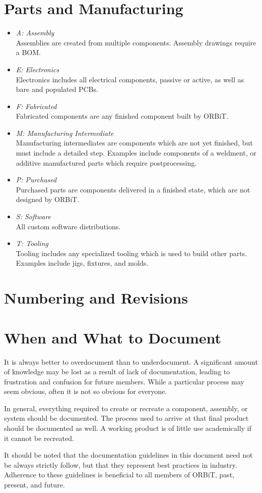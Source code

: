 \documentclass[12pt,article]{memoir}
\begin{document}
\newpage

\chapter{Parts and Manufacturing}
\begin{itemize}
\item \textit{A: Assembly}\\
Assemblies are created from multiple components. Assembly drawings require a BOM.
\item \textit{E: Electronics}\\
Electronics includes all electrical components, passive or active, as well as bare and populated PCBs.
\item \textit{F: Fabricated}\\
Fabricated components are any finished component built by ORBiT.
\item \textit{M: Manufacturing Intermediate}\\
Manufacturing intermediates are components which are not yet finished, but must include a detailed step. Examples include components of a weldment, or additive manufactured parts which require postprocessing.
\item \textit{P: Purchased}\\
Purchased parts are components delivered in a finished state, which are not designed by ORBiT.
\item \textit{S: Software}\\
All custom software distributions.
\item \textit{T: Tooling}\\
Tooling includes any specialized tooling which is used to build other parts. Examples include jigs, fixtures, and molds.
\end{itemize}

\newpage

\chapter{Numbering and Revisions}



\newpage

\chapter{When and What to Document}
It is always better to overdocument than to underdocument. A significant amount of knowledge may be lost as a result of lack of documentation, leading to frustration and confusion for future members. While a particular process may seem obvious, often it is not so obvious for everyone.\par
In general, everything required to create or recreate a component, assembly, or system should be documented. The process used to arrive at that final product should be documented as well. A working product is of little use academically if it cannot be recreated.\par
It should be noted that the documentation guidelines in this document need not be always strictly follow, but that they represent best practices in industry. Adherence to these guidelines is beneficial to all members of ORBiT, past, present, and future.

\end{document}
